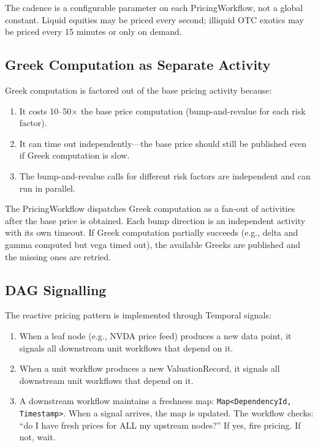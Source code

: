 \documentclass[11pt,a4paper]{article}
\begin{document}
\noindent The cadence is a configurable parameter on each PricingWorkflow, not a global constant.  Liquid equities may be priced every second; illiquid OTC exotics may be priced every 15 minutes or only on demand.

\subsection{Greek Computation as Separate Activity}

Greek computation is factored out of the base pricing activity because:
\begin{enumerate}[nosep]
\item It costs 10--50$\times$ the base price computation (bump-and-revalue for each risk factor).
\item It can time out independently---the base price should still be published even if Greek computation is slow.
\item The bump-and-revalue calls for different risk factors are independent and can run in parallel.
\end{enumerate}

\noindent The PricingWorkflow dispatches Greek computation as a fan-out of activities after the base price is obtained.  Each bump direction is an independent activity with its own timeout.  If Greek computation partially succeeds (e.g., delta and gamma computed but vega timed out), the available Greeks are published and the missing ones are retried.

\subsection{DAG Signalling}

The reactive pricing pattern is implemented through Temporal signals:

\begin{enumerate}[nosep]
\item When a leaf node (e.g., NVDA price feed) produces a new data point, it signals all downstream unit workflows that depend on it.
\item When a unit workflow produces a new ValuationRecord, it signals all downstream unit workflows that depend on it.
\item A downstream workflow maintains a freshness map: \texttt{Map<DependencyId, Timestamp>}.  When a signal arrives, the map is updated.  The workflow checks: ``do I have fresh prices for ALL my upstream nodes?''  If yes, fire pricing.  If not, wait.
\end{enumerate}
\end{document}

